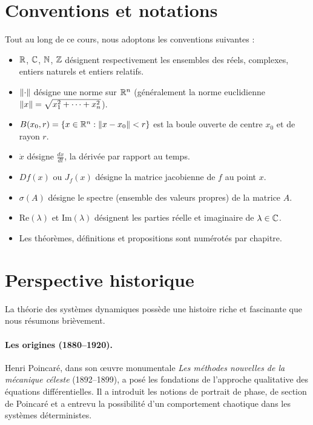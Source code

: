 \section*{Conventions et notations}

Tout au long de ce cours, nous adoptons les conventions suivantes :

\begin{itemize}
    \item $\mathbb{R}$, $\mathbb{C}$, $\mathbb{N}$, $\mathbb{Z}$ d\'esignent respectivement les ensembles
    des r\'eels, complexes, entiers naturels et entiers relatifs.

    \item $\left\| \cdot \right\|$ d\'esigne une norme sur $\mathbb{R}^n$ (g\'en\'eralement la
    norme euclidienne $\left\| x \right\| = \sqrt{x_1^2 + \cdots + x_n^2}$).

    \item $B(x_0, r) = \{x \in \mathbb{R}^n : \left\| x - x_0 \right\| < r\}$ est la boule
    ouverte de centre $x_0$ et de rayon $r$.

    \item $\dot{x}$ d\'esigne $\frac{dx}{dt}$, la d\'eriv\'ee par rapport au
    temps.

    \item $Df(x)$ ou $J_f(x)$ d\'esigne la matrice jacobienne de $f$ au
    point $x$.

    \item $\sigma(A)$ d\'esigne le spectre (ensemble des valeurs propres) de
    la matrice $A$.

    \item $\text{Re}(\lambda)$ et $\text{Im}(\lambda)$ d\'esignent les parties
    r\'eelle et imaginaire de $\lambda \in \mathbb{C}$.

    \item Les th\'eor\`emes, d\'efinitions et propositions sont num\'erot\'es
    par chapitre.
\end{itemize}

\section*{Perspective historique}

La th\'eorie des syst\`emes dynamiques poss\`ede une histoire riche et
fascinante que nous r\'esumons bri\`evement.

\paragraph{Les origines (1880--1920).}
Henri Poincar\'e, dans son \oe uvre monumentale \emph{Les m\'ethodes
nouvelles de la m\'ecanique c\'eleste} (1892--1899), a pos\'e les fondations
de l'approche qualitative des \'equations diff\'erentielles. Il a introduit
les notions de portrait de phase, de section de Poincar\'e et a entrevu la
possibilit\'e d'un comportement chaotique dans les syst\`emes d\'eterministes.

